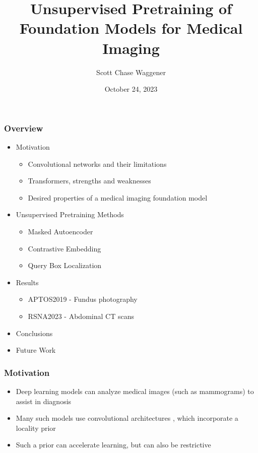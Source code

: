 \documentclass{beamer}
\title[Foundation Models]{Unsupervised Pretraining of Foundation Models for Medical Imaging}
\author{Scott Chase Waggener}
\date{October 24, 2023}
\begin{document}
\frame{\titlepage}

\begin{frame}
   \frametitle{Overview}
   \begin{itemize}
        \item Motivation
        \begin{itemize}
            \item Convolutional networks and their limitations
            \item Transformers, strengths and weaknesses
            \item Desired properties of a medical imaging foundation model
        \end{itemize}
        \item Unsupervised Pretraining Methods
        \begin{itemize}
            \item Masked Autoencoder
            \item Contrastive Embedding
            \item Query Box Localization
        \end{itemize}
        \item Results
        \begin{itemize}
            \item APTOS2019 - Fundus photography
            \item RSNA2023 - Abdominal CT scans
        \end{itemize}
        \item Conclusions
        \item Future Work
   \end{itemize}
\end{frame}


\begin{frame}
   \frametitle{Motivation}
   \begin{itemize}
        \item Deep learning models can analyze medical images (such as mammograms) to assist in diagnosis \cite{McKinney2020}
        \item Many such models use convolutional architectures \cite{COGAN201918}, which incorporate a locality prior
        \item Such a prior can accelerate learning, but can also be restrictive
   \end{itemize}
\end{frame}
\end{document}
